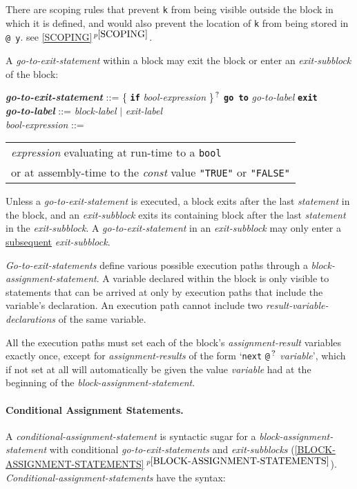 \documentclass[12pt]{article}
\newcommand{\subsubsubsection}[1]{\paragraph[#1]{#1.}}
\newcommand{\TT}[1]{{\tt \bfseries #1}}
\newcommand{\QMARK}{{$^{\,\mbox{\footnotesize ?}}$}}
\newcommand{\ttkey}[1]{{\tt \bfseries #1}}
\newcommand{\emkey}[1]{{\em \bfseries #1}}
\newcommand{\itemref}[1]{\ref{#1}$\,^{p\pageref{#1}}$}
\newenvironment{indpar}[1][0.3in]%
	{\begin{list}{}%
		     {\setlength{\itemsep}{0in}%
		      \setlength{\topsep}{0in}%
		      \setlength{\parsep}{1ex}%
		      \setlength{\labelwidth}{#1}%
		      \setlength{\leftmargin}{#1}%
		      \addtolength{\leftmargin}{\labelsep}}%
	 \item}%
	{\end{list}}
\begin{document}
There are scoping rules that prevent {\tt k} from being visible
outside the block in which it is defined, and would also
prevent the location of {\tt k} from being stored in {\tt @ y}.
see \itemref{SCOPING}.

A {\em go-to-exit-statement} within a block may exit the block or
enter an {\em exit-subblock} of the block:
\begin{indpar}
\emkey{go-to-exit-statement}\label{GO-TO-STATEMENT} ::=
    \{ \TT{if} {\em bool-expression} \}\QMARK{}
    \ttkey{go to} {\em go-to-label} \TT{exit}
\\[0.5ex]
\emkey{go-to-label} ::= {\em block-label} $|$ {\em exit-label}
\\[0.5ex]
{\em bool-expression}\label{BOOL-EXPRESSION} ::=
    \begin{tabular}[t]{@{}l}
    {\em expression} evaluating at run-time to a {\tt bool} \\
    or at assembly-time to the {\em const} value {\tt "TRUE"} or {\tt "FALSE"}
    \end{tabular}
\end{indpar}

Unless a {\em go-to-exit-statement} is executed,
a block exits after the last {\em statement} in the block,
and an {\em exit-subblock} exits its containing block after the last
{\em statement} in the {\em exit-subblock}.
A {\em go-to-exit-statement} in an {\em exit-subblock} may only enter
a \underline{subsequent} {\em exit-subblock}.

{\em Go-to-exit-statements} define various possible execution
paths through a {\em block-assignment-statement}.
A variable declared within the block is only visible to statements that can be
arrived at only by execution paths that include the variable's
declaration.  An execution path cannot include
two {\em result-variable-declarations} of the same variable.

All the execution paths must set each of the
block's {\em assignment-result} variables exactly once, except for
{\em assignment-results} of the form
`{\tt next} {\tt @}\QMARK{} {\em variable}', which if not set at all will
automatically be given the value {\em variable} had at the beginning
of the {\em block-assignment-statement}.


\subsubsubsection{Conditional Assignment Statements}
\label{CONDITIONAL-ASSIGNMENT-STATEMENTS}

A {\em conditional-assignment-statement}
is syntactic sugar for a {\em block-assignment-statement}
with conditional {\em go-to-exit-statements}
and {\em exit-subblocks} (\itemref{BLOCK-ASSIGNMENT-STATEMENTS}).
{\em Conditional-assignment-statements} have the syntax:
\end{document}
